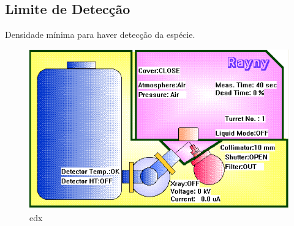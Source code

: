 \subsection{Limite de Detecção}

Densidade mínima para haver detecção da espécie. %

\begin{figure}[H]
\begin{center}
  \includegraphics[scale=0.4]{../inputs/images/edx_iag_monitor.png}
  \caption{edx}
\end{center}
\end{figure}



